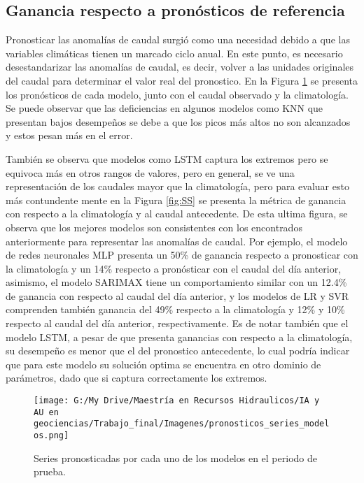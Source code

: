 \documentclass[draft]{agujournal2019}
\begin{document}
\subsection{Ganancia respecto a pronósticos de referencia}

Pronosticar las anomalías de caudal surgió como una necesidad debido a que las variables climáticas tienen un marcado ciclo anual. En este punto, es necesario desestandarizar las anomalías de caudal, es decir, volver a las unidades originales del caudal para determinar el valor real del pronostico. En la Figura \ref{fig:series_pron} se presenta los pronósticos de cada modelo, junto con el caudal observado y la climatología. Se puede observar que las deficiencias en algunos modelos como KNN que presentan bajos desempeños se debe a que los picos más altos no son alcanzados y estos pesan más en el error. 

También se observa que modelos como LSTM captura los extremos pero se equivoca más en otros rangos de valores, pero en general, se ve una representación de los caudales mayor que la climatología, pero para evaluar esto más contundente mente en la Figura \ref{fig:SS} se presenta la métrica de ganancia con respecto a la climatología y al caudal antecedente. De esta ultima figura, se observa que los mejores modelos son consistentes con los encontrados anteriormente para representar las anomalías de caudal. Por ejemplo, el modelo de redes neuronales MLP presenta un 50\% de ganancia respecto a pronosticar con la climatología y un 14\% respecto a pronósticar con el caudal del día anterior, asimismo, el modelo SARIMAX tiene un comportamiento similar con un 12.4\% de ganancia con respecto al caudal del día anterior, y los modelos de LR y SVR comprenden también ganancia del 49\% respecto a la climatología y 12\% y 10\% respecto al caudal del día anterior, respectivamente. Es de notar también que el modelo LSTM, a pesar de que presenta ganancias con respecto a la climatología, su desempeño es menor que el del pronostico antecedente, lo cual podría indicar que para este modelo su solución optima se encuentra en otro dominio de parámetros, dado que si captura correctamente los extremos.


\begin{figure}[!]
	\centering%
	\texttt{[image: G:/My Drive/Maestría en Recursos Hidraulicos/IA y AU en geociencias/Trabajo\_final/Imagenes/pronosticos\_series\_modelos.png]}
	\caption{Series pronosticadas por cada uno de los modelos en el periodo de prueba.} \label{fig:series_pron}
\end{figure}
\end{document}
